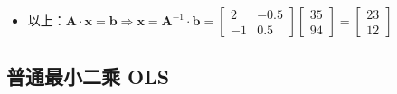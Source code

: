 \documentclass[serif,aspectratio=169]{beamer}
\begin{document}
\begin{frame}
\begin{itemize}
\begin{itemize}
    \item 以上：$\mathbf{A\cdot x}=\mathbf{b} \Rightarrow \mathbf{x}=\mathbf{A}^{-1}\cdot\mathbf{b}=\left[\begin{array}{rr}2 & -0.5\\ -1 & 0.5\end{array}\right]\left[\begin{array}{c}35\\ 94 \end{array}\right]=\left[\begin{array}{c}23\\ 12 \end{array}\right]$
      
    \end{itemize}
  \end{itemize}
\end{frame}


\subsection{普通最小二乘 OLS}
\end{document}
